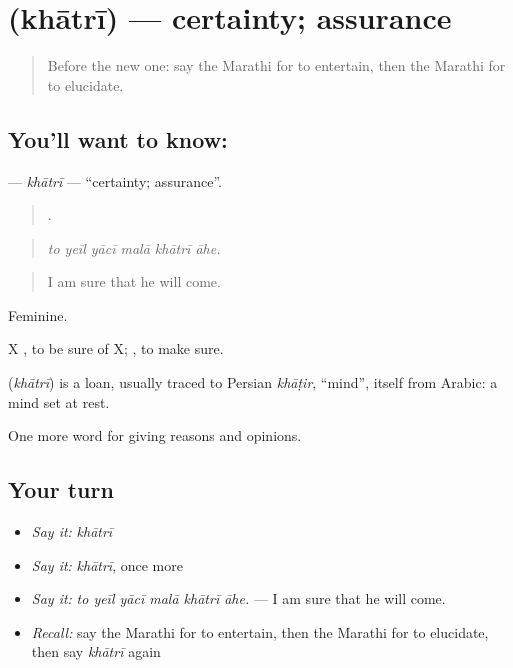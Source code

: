 \section[\texorpdfstring{\mr{खात्री} (khātrī)}{खात्री (khātrī)}]{ (khātrī) — certainty; assurance}

\label{lesson:MR-C346-khatri}



\begin{quote}
Before the new one: say the Marathi for to entertain, then the Marathi for to elucidate.
\end{quote}

\subsection*{You'll want to know: }
\textbf{} — \emph{khātrī} — \textquotedblleft{}certainty; assurance\textquotedblright{}.

\begin{quote}
     .
\end{quote}

\begin{quote}
\emph{to yeīl yācī malā khātrī āhe.}
\end{quote}

\begin{quote}
I am sure that he will come.
\end{quote}

Feminine.

X   , to be sure of X;  , to make sure.

\begin{cousinweb}
\textbf{} (\emph{khātrī}) is a loan, usually traced to Persian \emph{khāṭir}, \textquotedblleft{}mind\textquotedblright{}, itself from Arabic: a mind set at rest.
\end{cousinweb}

\begin{grammarlens}[title={What you've built}]
One more word for giving reasons and opinions.
\end{grammarlens}

\subsection*{Your turn}
\begin{itemize}
\raggedright
  \item \emph{Say it:} \emph{khātrī}
  \item \emph{Say it:} \emph{khātrī}, once more
  \item \emph{Say it:} \emph{to yeīl yācī malā khātrī āhe.} — I am sure that he will come.
  \item \emph{Recall:} say the Marathi for to entertain, then the Marathi for to elucidate, then say \emph{khātrī} again
\end{itemize}

